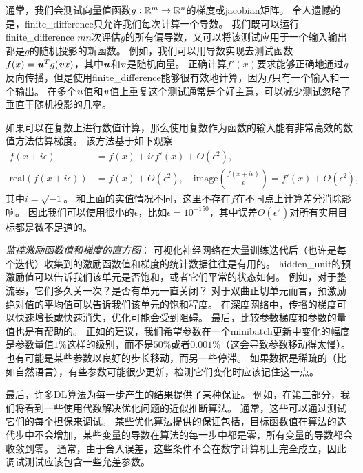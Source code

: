 
通常，我们会测试向量值函数$g:\mathbb{R}^m \to \mathbb{R}^n$的梯度或\gls{jacobian}矩阵。
令人遗憾的是，\gls{finite_difference}只允许我们每次计算一个导数。
我们既可以运行\gls{finite_difference} $mn$次评估$g$的所有偏导数，又可以将该测试应用于一个输入输出都是$g$的随机投影的新函数。
例如，我们可以用导数实现去测试函数$f(x) = \boldsymbol{\mathit{u}}^T g(\boldsymbol{\mathit{v}} x)$，其中$\boldsymbol{\mathit{u}}$和$\boldsymbol{\mathit{v}}$是随机向量。
正确计算$f'(x)$要求能够正确地通过$g$反向传播，但是使用\gls{finite_difference}能够很有效地计算，因为$f$只有一个输入和一个输出。
在多个$\boldsymbol{\mathit{u}}$值和$\boldsymbol{\mathit{v}}$值上重复这个测试通常是个好主意，可以减少测试忽略了垂直于随机投影的几率。


如果可以在复数上进行数值计算，那么使用复数作为函数的输入能有非常高效的数值方法估算梯度\citep{Squire+Trapp-1998}。
该方法基于如下观察
\begin{align}
	f(x + i\epsilon) &= f(x) + i\epsilon f'(x) + O(\epsilon^2) ,\\
	\text{real}( f(x+i\epsilon) ) &= f(x) + O(\epsilon^2), \quad \text{image}( \frac{f(x+i\epsilon)}{ \epsilon } ) = f'(x) + O(\epsilon^2),
\end{align}
其中$i=\sqrt{-1}$。
和上面的实值情况不同，这里不存在$f$在不同点上计算差分消除影响。
因此我们可以使用很小的$\epsilon$，比如$\epsilon = 10^{-150}$，其中误差$O(\epsilon^2)$对所有实用目标都是微不足道的。


\emph{监控激励函数值和梯度的直方图}：
可视化神经网络在大量训练迭代后（也许是每个迭代）收集到的激励函数值和梯度的统计数据往往是有用的。
\gls{hidden_unit}的预激励值可以告诉我们该单元是否饱和，或者它们平常的状态如何。
例如，对于整流器，它们多久关一次？是否有单元一直关闭？
对于双曲正切单元而言，预激励绝对值的平均值可以告诉我们该单元的饱和程度。
在深度网络中，传播的梯度可以快速增长或快速消失，优化可能会受到阻碍。
最后，比较参数梯度和参数的量值也是有帮助的。
正如\citep{Bottou-DLSS2015}的建议，我们希望参数在一个\gls{minibatch}更新中变化的幅度是参数量值$1\%$这样的级别，而不是$50\%$或者$0.001\%$（这会导致参数移动得太慢）。
也有可能是某些参数以良好的步长移动，而另一些停滞。
如果数据是稀疏的（比如自然语言），有些参数可能很少更新，检测它们变化时应该记住这一点。


最后，许多\gls{DL}算法为每一步产生的结果提供了某种保证。
例如，在第三部分，我们将看到一些使用代数解决优化问题的近似推断算法。
通常，这些可以通过测试它们的每个担保来调试。
某些优化算法提供的保证包括，目标函数值在算法的迭代步中不会增加，某些变量的导数在算法的每一步中都是零，所有变量的导数都会收敛到零。
通常，由于舍入误差，这些条件不会在数字计算机上完全成立，因此调试测试应该包含一些允差参数。

